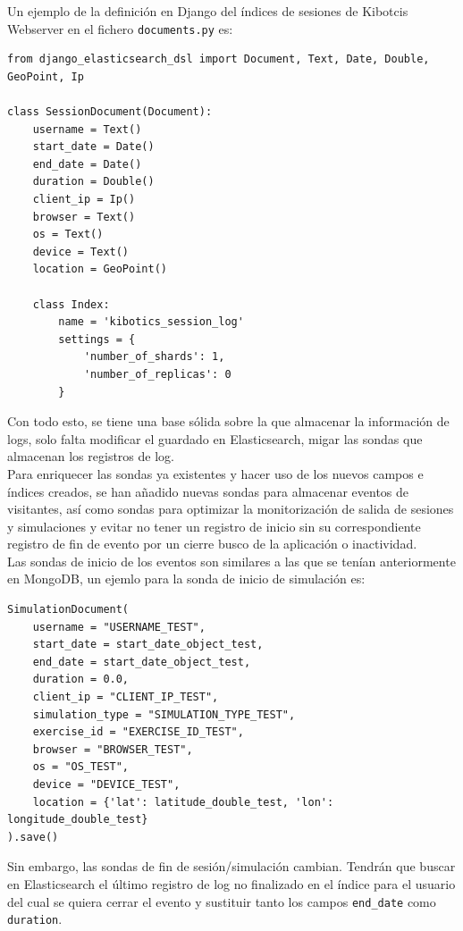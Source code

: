 \documentclass[11pt,a4paper]{book}
\begin{document}
				Un ejemplo de la definición en Django del índices de sesiones de Kibotcis Webserver en el fichero \texttt{documents.py} es:
				
				\begin{Verbatim}[tabsize=4]
from django_elasticsearch_dsl import Document, Text, Date, Double, GeoPoint, Ip
				
class SessionDocument(Document):
	username = Text()
	start_date = Date()
	end_date = Date()
	duration = Double()
	client_ip = Ip()
	browser = Text()
	os = Text()
	device = Text()
	location = GeoPoint()
	
	class Index:
		name = 'kibotics_session_log'
		settings = {
			'number_of_shards': 1,
			'number_of_replicas': 0
		}		
				\end{Verbatim}
				
					
				Con todo esto, se tiene una base sólida sobre la que almacenar la información de logs, solo falta modificar el guardado en Elasticsearch, migar las sondas que almacenan los registros de log.\\
				
			 	Para enriquecer las sondas ya existentes y hacer uso de los nuevos campos e índices creados, se han añadido nuevas sondas para almacenar eventos de visitantes, así como sondas para optimizar la monitorización de salida de sesiones y simulaciones y evitar no tener un registro de inicio sin su correspondiente registro de fin de evento por un cierre busco de la aplicación o inactividad.\\
			 				 					
				Las sondas de inicio de los eventos son similares a las que se tenían anteriormente en MongoDB, un ejemlo para la sonda de inicio de simulación es:
				
				\begin{Verbatim}[tabsize=4]
SimulationDocument(
	username = "USERNAME_TEST",
	start_date = start_date_object_test,
	end_date = start_date_object_test,
	duration = 0.0,
	client_ip = "CLIENT_IP_TEST",
	simulation_type = "SIMULATION_TYPE_TEST",
	exercise_id = "EXERCISE_ID_TEST",
	browser = "BROWSER_TEST",
	os = "OS_TEST",
	device = "DEVICE_TEST",
	location = {'lat': latitude_double_test, 'lon': longitude_double_test}
).save()
				\end{Verbatim}

				Sin embargo, las sondas de fin de sesión/simulación cambian. Tendrán que buscar en Elasticsearch el último registro de log no finalizado en el índice para el usuario del cual se quiera cerrar el evento y sustituir tanto los campos \texttt{end\_date} como \texttt{duration}. \\
				
\end{document}
